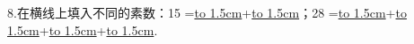 \question 8.在横线上填入不同的素数：15 =\underline{\hbox to 1.5cm{}}+\underline{\hbox to 1.5cm{}}；28 =\underline{\hbox to 1.5cm{}}+\underline{\hbox to 1.5cm{}}+\underline{\hbox to 1.5cm{}}+\underline{\hbox to 1.5cm{}}.